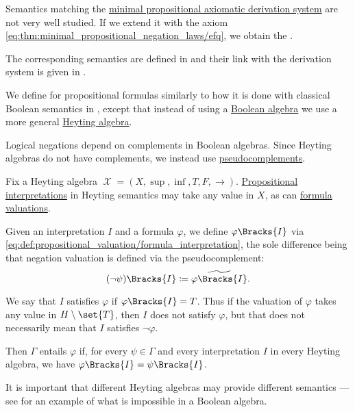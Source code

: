 \begin{definition}\label{def:intuitionistic_propositional_axiomatic_derivation_system}
  Semantics matching the \hyperref[def:minimal_propositional_axiomatic_derivation_system]{minimal propositional axiomatic derivation system} are not very well studied. If we extend it with the axiom \eqref{eq:thm:minimal_propositional_negation_laws/efq}, we obtain the .

  The corresponding semantics are defined in  and their link with the derivation system is given in .
\end{definition}

\begin{definition}\label{def:propositional_heyting_algebra_semantics}
  We define  for propositional formulas similarly to how it is done with classical Boolean semantics in , except that instead of using a \hyperref[def:boolean_algebra]{Boolean algebra} we use a more general \hyperref[def:heyting_algebra]{Heyting algebra}.

  Logical negations depend on complements in Boolean algebras. Since Heyting algebras do not have complements, we instead use \hyperref[def:heyting_algebra/pseudocomplement]{pseudocomplements}.

  Fix a Heyting algebra \( \mscrX = (X, \sup, \inf, T, F, \rightarrow) \). \hyperref[def:propositional_valuation/interpretation]{Propositional interpretations} in Heyting semantics may take any value in \( X \), as can \hyperref[def:propositional_valuation/formula_valuation]{formula valuations}.

  Given an interpretation \( I \) and a formula \( \varphi \), we define \( \varphi\Bracks{I} \) via \eqref{eq:def:propositional_valuation/formula_interpretation}, the sole difference being that negation valuation is defined via the pseudocomplement:
  \begin{equation*}
    (\neg \psi)\Bracks{I} \coloneqq \widetilde{\varphi\Bracks{I}}.
  \end{equation*}

  We say that \( I \) satisfies \( \varphi \) if \( \varphi\Bracks{I} = T \). Thus if the valuation of \( \varphi \) takes any value in \( H \setminus \set{ T } \), then \( I \) does not satisfy \( \varphi \), but that does not necessarily mean that \( I \) satisfies \( \neg \varphi \).

  Then \( \Gamma \) entails \( \varphi \) if, for every \( \psi \in \Gamma \) and every interpretation \( I \) in every Heyting algebra, we have \( \varphi\Bracks{I} = \psi\Bracks{I} \).

  It is important that different Heyting algebras may provide different semantics --- see  for an example of what is impossible in a Boolean algebra.
\end{definition}

